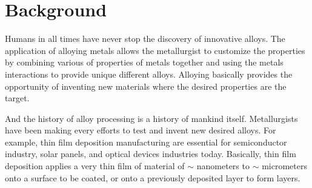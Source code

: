 \section{Background}

Humans in all times have never stop the discovery of innovative alloys. The application of alloying metals allows the metallurgist to customize the properties by combining various of properties of metals together and using the metals interactions to provide unique different alloys. Alloying basically provides the opportunity of inventing new materials where the desired properties are the target.

And the history of alloy processing is a history of mankind itself. Metallurgists have been making every efforts to test and invent new desired alloys. For example, thin film deposition manufacturing are essential for semiconductor industry, solar panels, and optical devices industries today. Basically, thin film deposition applies a very thin film of material of $\sim$ nanometers to $\sim$ micrometers onto a surface to be coated, or onto a previously deposited layer to form layers.